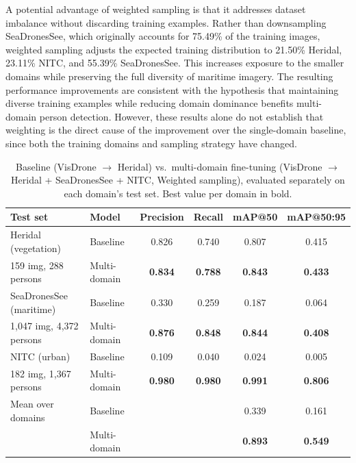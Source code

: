 \documentclass{article}
\begin{document}
A potential advantage of weighted sampling is that it addresses dataset imbalance without discarding training examples. Rather than downsampling SeaDronesSee, which originally accounts for 75.49\% of the training images, weighted sampling adjusts the expected training distribution to 21.50\% Heridal, 23.11\% NITC, and 55.39\% SeaDronesSee. This increases exposure to the smaller domains while preserving the full diversity of maritime imagery. The resulting performance improvements are consistent with the hypothesis that maintaining diverse training examples while reducing domain dominance benefits multi-domain person detection. However, these results alone do not establish that weighting is the direct cause of the improvement over the single-domain baseline, since both the training domains and sampling strategy have changed.



\begin{table}[h]
  \caption{Baseline (VisDrone $\rightarrow$ Heridal) vs.\ multi-domain fine-tuning (VisDrone $\rightarrow$ Heridal + SeaDronesSee + NITC, Weighted sampling), evaluated separately on each domain's test set. Best value per domain in bold.}
  \label{tab:balancing_results_reweighting}
  \centering
  \small
  \begin{tabular}{llcccc}
    \toprule
    Test set & Model & Precision & Recall & mAP@50 & mAP@50:95 \\
    \midrule
    Heridal (vegetation) & Baseline & 0.826 & 0.740 & 0.807 & 0.415 \\
    {\footnotesize 159 img, 288 persons} & Multi-domain & \textbf{0.834} & \textbf{0.788} & \textbf{0.843} & \textbf{0.433} \\
    \midrule
    SeaDronesSee (maritime) & Baseline & 0.330 & 0.259 & 0.187 & 0.064 \\
    {\footnotesize 1,047 img, 4,372 persons} & Multi-domain & \textbf{0.876} & \textbf{0.848} & \textbf{0.844} & \textbf{0.408} \\
    \midrule
    NITC (urban) & Baseline & 0.109 & 0.040 & 0.024 & 0.005 \\
    {\footnotesize 182 img, 1,367 persons} & Multi-domain & \textbf{0.980} & \textbf{0.980} & \textbf{0.991} & \textbf{0.806} \\
    \midrule
    Mean over domains & Baseline & & & 0.339 & 0.161 \\
     & Multi-domain & & & \textbf{0.893} & \textbf{0.549} \\
    \bottomrule
  \end{tabular}
\end{table}
\end{document}
